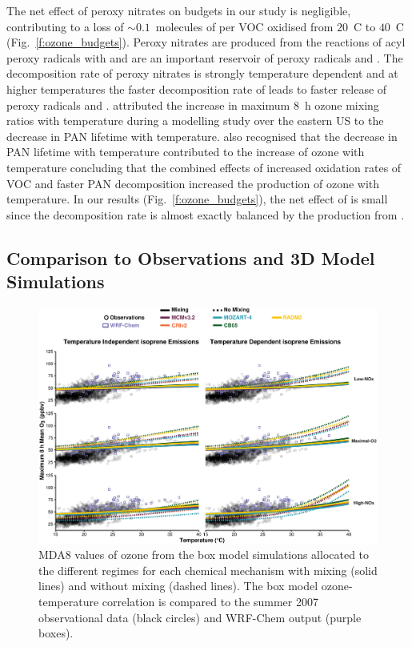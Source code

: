 \vspace{-5mm}
The net effect of peroxy nitrates on  budgets in our study is negligible, contributing to a loss of $\sim0.1$~molecules of  per VOC oxidised from $20$~\degree C to $40$~\degree C (Fig.~\ref{f:ozone_budgets}).
Peroxy nitrates are produced from the reactions of acyl peroxy radicals with  and are an important reservoir of peroxy radicals and .
The decomposition rate of peroxy nitrates is strongly temperature dependent and at higher temperatures the faster decomposition rate of  leads to faster release of peroxy radicals and .
\citet{Dawson:2007} attributed the increase in maximum 8~h ozone mixing ratios with temperature during a modelling study over the eastern US to the decrease in PAN lifetime with temperature.
\citet{Steiner:2006} also recognised that the decrease in PAN lifetime with temperature contributed to the increase of ozone with temperature concluding that the combined effects of increased oxidation rates of VOC and faster PAN decomposition increased the production of ozone with temperature.
In our results (Fig.~\ref{f:ozone_budgets}), the net effect of  is small since the decomposition rate is almost exactly balanced by the production from .

\subsection{Comparison to Observations and 3D Model Simulations} \label{ss:r_observations}
\begin{figure}[t]%
    \centering%
    \caption{MDA8 values of ozone from the box model simulations allocated to the different  regimes for each chemical mechanism with mixing (solid lines) and without mixing (dashed lines). The box model ozone-temperature correlation is compared to the summer 2007 observational data (black circles) and WRF-Chem output (purple boxes).}%
    \label{f:comparison}%
    \vspace{2mm}%
    \includegraphics[height=0.43\textheight]{img/Germany_O3-T_ERA_WRF_2007}%
\end{figure}


